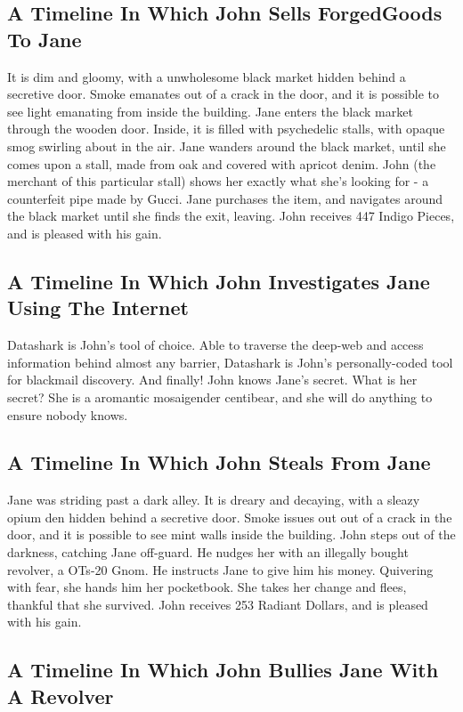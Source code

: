 \documentclass{article}
\begin{document}
\subsection{A Timeline In Which John Sells ForgedGoods To Jane}


It is dim and gloomy, with a unwholesome black market hidden behind a secretive door.
Smoke emanates out of a crack in the door, and it is possible to see light emanating from inside the building.
Jane enters the black market through the wooden door.
Inside, it is filled with psychedelic stalls, with opaque smog swirling about in the air.
Jane wanders around the black market, until she comes upon a stall, made from oak and covered with apricot denim.
John (the merchant of this particular stall) shows her exactly what she's looking for {-} a counterfeit pipe made by Gucci.
Jane purchases the item, and navigates around the black market until she finds the exit, leaving.
John receives 447 Indigo Pieces, and is pleased with his gain.
\subsection{A Timeline In Which John Investigates Jane Using The Internet}


Datashark is John's tool of choice. Able to traverse the deep{-}web and access information behind almost any barrier, Datashark is John's personally{-}coded tool for blackmail discovery.
And finally!
John knows Jane's secret. What is her secret? She is a aromantic mosaigender centibear, and she will do anything to ensure nobody knows.
\subsection{A Timeline In Which John Steals From Jane}


Jane was striding past a dark alley.
It is dreary and decaying, with a sleazy opium den hidden behind a secretive door.
Smoke issues out out of a crack in the door, and it is possible to see mint walls inside the building.
John steps out of the darkness, catching Jane off{-}guard.
He nudges her with an illegally bought revolver, a OTs{-}20 Gnom.
He instructs Jane to give him his money.
Quivering with fear, she hands him her pocketbook.
She takes her change and flees, thankful that she survived.
John receives 253 Radiant Dollars, and is pleased with his gain.
\subsection{A Timeline In Which John Bullies Jane With A Revolver}
\end{document}
